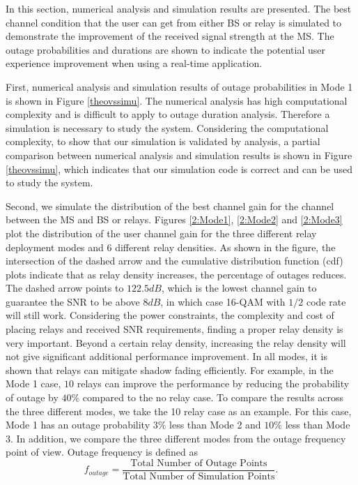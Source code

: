 \par In this section, numerical analysis and simulation results are presented. The best channel condition that the user can get from either BS or relay is simulated to demonstrate the improvement of the received signal strength at the MS. The outage probabilities and durations are shown to indicate the potential user experience improvement when using a real-time application.
\par First, numerical analysis and simulation results of outage probabilities in Mode 1 is shown in Figure \ref{theovssimu}. The numerical analysis has high computational complexity and is difficult to apply to outage duration analysis. Therefore a simulation is necessary to study the system. Considering the computational complexity, to show that our simulation is validated by analysis, a partial comparison between numerical analysis and simulation results is shown in Figure \ref{theovssimu}, which indicates that our simulation code is correct and can be used to study the system.
\par Second, we simulate the distribution of the best channel gain for the channel between the MS and BS or relays. Figures \ref{2:Mode1}, \ref{2:Mode2}  and \ref{2:Mode3} plot the distribution of the user channel gain for the three different relay deployment modes and 6 different relay densities. As shown in the figure, the intersection of the dashed arrow and the cumulative distribution function (cdf) plots indicate that as relay density increases, the percentage of outages reduces. The dashed arrow points to $122.5dB$, which is the lowest channel gain to guarantee the SNR to be above $8dB$, in which case 16-QAM with $1/2$ code rate will still work. Considering the power constraints, the complexity and cost of placing relays and received SNR requirements, finding a proper relay density is very important. Beyond a certain relay density, increasing the relay density will not give significant additional performance improvement. In all modes, it is shown that relays can mitigate shadow fading efficiently. For example, in the Mode 1 case, $10$ relays can improve the performance by reducing the probability of outage by $40\%$ compared to the no relay case. To compare the results across the three different modes, we take the 10 relay case as an example. For this case, Mode 1 has an outage probability $3\%$ less than Mode 2 and $10\%$ less than Mode 3. In addition, we compare the three different modes from the outage frequency point of view. Outage frequency is defined as
\begin{equation}
f_{outage}=\frac{\text{Total Number of Outage Points}}{\text{Total Number of Simulation Points}}.
\end{equation}
